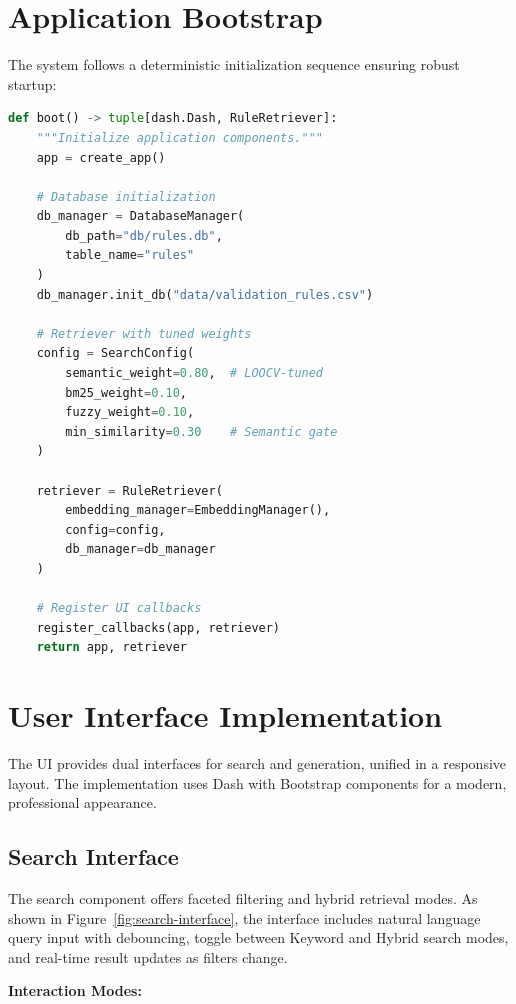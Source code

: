 \section{Application Bootstrap}

The system follows a deterministic initialization sequence ensuring robust startup:

\begin{lstlisting}[language=Python, caption={Bootstrap sequence (app.py)}, label={lst:bootstrap}]
def boot() -> tuple[dash.Dash, RuleRetriever]:
    """Initialize application components."""
    app = create_app()
    
    # Database initialization
    db_manager = DatabaseManager(
        db_path="db/rules.db",
        table_name="rules"
    )
    db_manager.init_db("data/validation_rules.csv")
    
    # Retriever with tuned weights
    config = SearchConfig(
        semantic_weight=0.80,  # LOOCV-tuned
        bm25_weight=0.10,
        fuzzy_weight=0.10,
        min_similarity=0.30    # Semantic gate
    )
    
    retriever = RuleRetriever(
        embedding_manager=EmbeddingManager(),
        config=config,
        db_manager=db_manager
    )
    
    # Register UI callbacks
    register_callbacks(app, retriever)
    return app, retriever
\end{lstlisting}

\section{User Interface Implementation}

The UI provides dual interfaces for search and generation, unified in a responsive layout. The implementation uses Dash with Bootstrap components for a modern, professional appearance.

\subsection{Search Interface}

The search component offers faceted filtering and hybrid retrieval modes. As shown in Figure~\ref{fig:search-interface}, the interface includes natural language query input with debouncing, toggle between Keyword and Hybrid search modes, and real-time result updates as filters change.

\textbf{Interaction Modes:}

